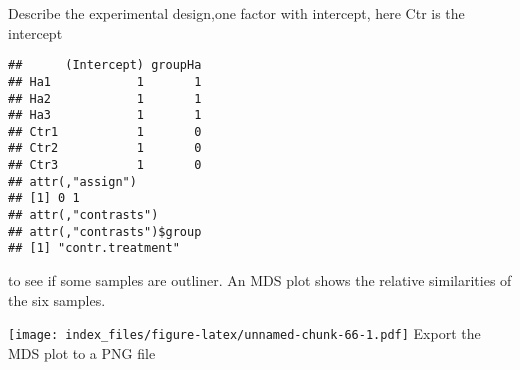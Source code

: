 \documentclass[
]{article}
\newenvironment{Shaded}{\begin{snugshade}}{\end{snugshade}}
\newcommand{\AttributeTok}[1]{\textcolor[rgb]{0.13,0.29,0.53}{#1}}
\newcommand{\DecValTok}[1]{\textcolor[rgb]{0.00,0.00,0.81}{#1}}
\newcommand{\FunctionTok}[1]{\textcolor[rgb]{0.13,0.29,0.53}{\textbf{#1}}}
\newcommand{\NormalTok}[1]{#1}
\newcommand{\OtherTok}[1]{\textcolor[rgb]{0.56,0.35,0.01}{#1}}
\newcommand{\SpecialCharTok}[1]{\textcolor[rgb]{0.81,0.36,0.00}{\textbf{#1}}}
\newcommand{\StringTok}[1]{\textcolor[rgb]{0.31,0.60,0.02}{#1}}
\begin{document}
Describe the experimental design,one factor with intercept, here Ctr is
the intercept

\begin{Shaded}
\end{Shaded}

\begin{verbatim}
##      (Intercept) groupHa
## Ha1            1       1
## Ha2            1       1
## Ha3            1       1
## Ctr1           1       0
## Ctr2           1       0
## Ctr3           1       0
## attr(,"assign")
## [1] 0 1
## attr(,"contrasts")
## attr(,"contrasts")$group
## [1] "contr.treatment"
\end{verbatim}

to see if some samples are outliner. An MDS plot shows the relative
similarities of the six samples.

\begin{Shaded}
\end{Shaded}

\texttt{[image: index\_files/figure-latex/unnamed-chunk-66-1.pdf]} Export
the MDS plot to a PNG file

\begin{Shaded}
\end{Shaded}
\end{document}
